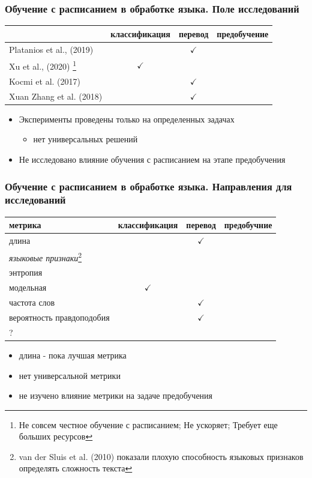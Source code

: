 \documentclass{beamer}
\begin{document}
\begin{frame}
	\frametitle{Обучение с расписанием в обработке языка. Поле исследований}
	\begin{table}
		\begin{tabular}{l|ccc}
			 & классификация & перевод & предобучение \\
			\hline
			Platanios et al., (2019) & & $\checkmark$ & \\
			Xu et al., (2020) \footnote[1]{Не совсем честное обучение с расписанием; Не ускоряет; Требует еще больших ресурсов} & $\checkmark$ & & \\
			Kocmi et al. (2017) & & $\checkmark$ & \\
			Xuan Zhang et al. (2018) & & $\checkmark$ & \\
			\hline
		\end{tabular}
	\end{table}
	
	\begin{itemize}
		\item Эксперименты проведены только на определенных задачах
			\begin{itemize}
				\item нет универсальных решений
			\end{itemize}
		\item Не исследовано влияние обучения с расписанием на этапе предобучения
	\end{itemize}
\end{frame}

\begin{frame}
	\frametitle{Обучение с расписанием в обработке языка. Направления для исследований}
	\begin{table}
		\begin{tabular}{l|ccc}
			метрика & классификация & перевод & предобучние \\
			\hline
			длина & & $\checkmark$ & \\
			{\it языковые признаки}\footnote[1]{van der Sluis et al. (2010) показали плохую способность языковых признаков определять сложность текста} & & & \\
			энтропия & & & \\
			модельная & $\checkmark$ & & \\
			частота слов & & $\checkmark$ & \\
			вероятность правдоподобия & & $\checkmark$ & \\
			? & & & \\
			\hline
		\end{tabular}
	\end{table}
	\begin{itemize}
		\item длина - пока лучшая метрика
		\item нет универсальной метрики
		\item не изучено влияние метрики на задаче предобучения
	\end{itemize}
\end{frame}
\end{document}
